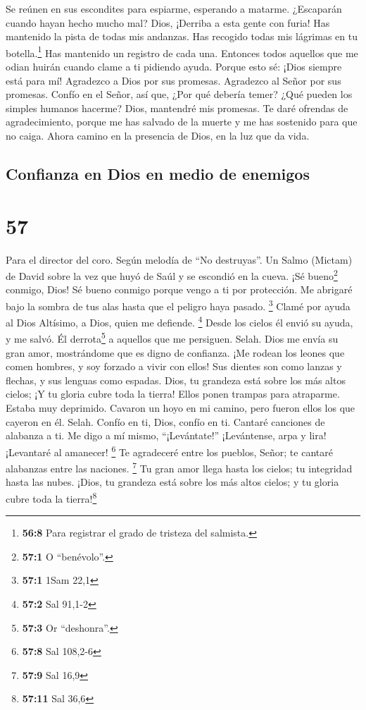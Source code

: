 Se reúnen en sus escondites para espiarme, esperando a
matarme.  ¿Escaparán cuando hayan hecho mucho mal? Dios,
¡Derriba a esta gente con furia!  Has mantenido la pista
de todas mis andanzas. Has recogido todas mis lágrimas en tu
botella.\footnote{\textbf{56:8} Para registrar el grado de tristeza del
  salmista.} Has mantenido un registro de cada una. 
Entonces todos aquellos que me odian huirán cuando clame a ti pidiendo
ayuda. Porque esto sé: ¡Dios siempre está para mí! 
Agradezco a Dios por sus promesas. Agradezco al Señor por sus promesas.
 Confío en el Señor, así que, ¿Por qué debería temer?
¿Qué pueden los simples humanos hacerme?  Dios, mantendré
mis promesas. Te daré ofrendas de agradecimiento,  porque
me has salvado de la muerte y me has sostenido para que no caiga. Ahora
camino en la presencia de Dios, en la luz que da vida.

\hypertarget{confianza-en-dios-en-medio-de-enemigos}{%
\subsection{Confianza en Dios en medio de
enemigos}\label{confianza-en-dios-en-medio-de-enemigos}}

\hypertarget{section-56}{%
\section{57}\label{section-56}}

Para el director del coro. Según melodía de ``No destruyas''. Un Salmo
(Mictam) de David sobre la vez que huyó de Saúl y se escondió en la
cueva.  ¡Sé bueno\footnote{\textbf{57:1} O ``benévolo''.}
conmigo, Dios! Sé bueno conmigo porque vengo a ti por protección. Me
abrigaré bajo la sombra de tus alas hasta que el peligro haya pasado.
\footnote{\textbf{57:1} 1Sam 22,1}  Clamé por ayuda al
Dios Altísimo, a Dios, quien me defiende. \footnote{\textbf{57:2} Sal
  91,1-2}  Desde los cielos él envió su ayuda, y me salvó.
Él derrota\footnote{\textbf{57:3} Or ``deshonra''.} a aquellos que me
persiguen. Selah. Dios me envía su gran amor, mostrándome que es digno
de confianza.  ¡Me rodean los leones que comen hombres, y
soy forzado a vivir con ellos! Sus dientes son como lanzas y flechas, y
sus lenguas como espadas.  Dios, tu grandeza está sobre
los más altos cielos; ¡Y tu gloria cubre toda la tierra! 
Ellos ponen trampas para atraparme. Estaba muy deprimido. Cavaron un
hoyo en mi camino, pero fueron ellos los que cayeron en él. Selah.
 Confío en ti, Dios, confío en ti. Cantaré canciones de
alabanza a ti.  Me digo a mí mismo, ``¡Levántate!''
¡Levántense, arpa y lira! ¡Levantaré al amanecer! \footnote{\textbf{57:8}
  Sal 108,2-6}  Te agradeceré entre los pueblos, Señor; te
cantaré alabanzas entre las naciones. \footnote{\textbf{57:9} Sal 16,9}
 Tu gran amor llega hasta los cielos; tu integridad hasta
las nubes.  ¡Dios, tu grandeza está sobre los más altos
cielos; y tu gloria cubre toda la tierra!\footnote{\textbf{57:11} Sal
  36,6}

